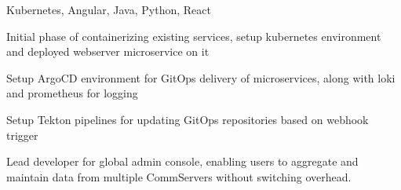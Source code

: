 \documentclass[]{font}
\begin{document}
\begin{minipage}[t]{0.66\textwidth}

\sectionsep

Kubernetes, Angular, Java, Python, React
\vspace{\topsep}
\begin{tightemize}
\item Initial phase of containerizing existing services, setup kubernetes environment and deployed webserver microservice on it
\item Setup ArgoCD environment for GitOps delivery of microservices, along with loki and prometheus for logging
\item Setup Tekton pipelines for updating GitOps repositories based on webhook trigger
\item Lead developer for global admin console, enabling users to aggregate and maintain data from multiple CommServers without switching overhead. 

\end{tightemize}
\end{minipage}
\end{document}
